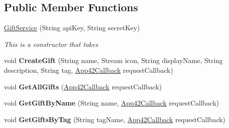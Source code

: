 \subsection*{Public Member Functions}
\begin{DoxyCompactItemize}
\item 
\hyperlink{classcom_1_1shephertz_1_1app42_1_1paas_1_1sdk_1_1windows_1_1gift_1_1_gift_service_ab7a035248e2ccdb1facf15f165143cdf}{Gift\+Service} (String api\+Key, String secret\+Key)
\begin{DoxyCompactList}\small\item\em This is a constructor that takes \end{DoxyCompactList}\item 
\hypertarget{classcom_1_1shephertz_1_1app42_1_1paas_1_1sdk_1_1windows_1_1gift_1_1_gift_service_af912e61acb95d4f5a930aa074102ee23}{void {\bfseries Create\+Gift} (String name, Stream icon, String display\+Name, String description, String tag, \hyperlink{interfacecom_1_1shephertz_1_1app42_1_1paas_1_1sdk_1_1windows_1_1_app42_callback}{App42\+Callback} request\+Callback)}\label{classcom_1_1shephertz_1_1app42_1_1paas_1_1sdk_1_1windows_1_1gift_1_1_gift_service_af912e61acb95d4f5a930aa074102ee23}

\item 
\hypertarget{classcom_1_1shephertz_1_1app42_1_1paas_1_1sdk_1_1windows_1_1gift_1_1_gift_service_a48ccec479575f93e444257a64d4e291b}{void {\bfseries Get\+All\+Gifts} (\hyperlink{interfacecom_1_1shephertz_1_1app42_1_1paas_1_1sdk_1_1windows_1_1_app42_callback}{App42\+Callback} request\+Callback)}\label{classcom_1_1shephertz_1_1app42_1_1paas_1_1sdk_1_1windows_1_1gift_1_1_gift_service_a48ccec479575f93e444257a64d4e291b}

\item 
\hypertarget{classcom_1_1shephertz_1_1app42_1_1paas_1_1sdk_1_1windows_1_1gift_1_1_gift_service_a7ce28709caee4d32682cc1c48d6af16a}{void {\bfseries Get\+Gift\+By\+Name} (String name, \hyperlink{interfacecom_1_1shephertz_1_1app42_1_1paas_1_1sdk_1_1windows_1_1_app42_callback}{App42\+Callback} request\+Callback)}\label{classcom_1_1shephertz_1_1app42_1_1paas_1_1sdk_1_1windows_1_1gift_1_1_gift_service_a7ce28709caee4d32682cc1c48d6af16a}

\item 
\hypertarget{classcom_1_1shephertz_1_1app42_1_1paas_1_1sdk_1_1windows_1_1gift_1_1_gift_service_a32cb2f963c18a5e1206a01f4dd50764f}{void {\bfseries Get\+Gifts\+By\+Tag} (String tag\+Name, \hyperlink{interfacecom_1_1shephertz_1_1app42_1_1paas_1_1sdk_1_1windows_1_1_app42_callback}{App42\+Callback} request\+Callback)}\label{classcom_1_1shephertz_1_1app42_1_1paas_1_1sdk_1_1windows_1_1gift_1_1_gift_service_a32cb2f963c18a5e1206a01f4dd50764f}


\end{DoxyCompactItemize}
